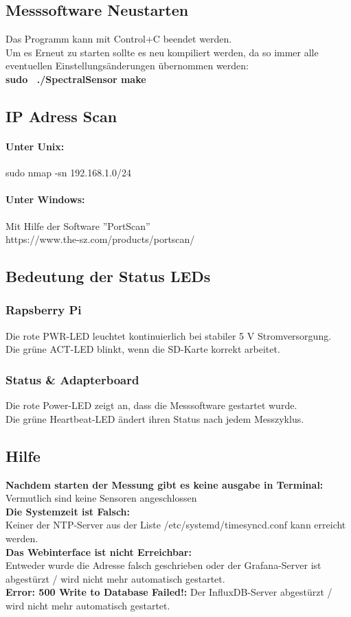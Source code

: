 \subsection{Messsoftware Neustarten}
\label{restart}
Das Programm kann mit Control+C beendet werden.\\
Um es Erneut zu starten sollte es neu kompiliert werden, da so immer alle eventuellen Einstellungsänderungen übernommen werden:\\
\textbf{sudo ~./SpectralSensor make}\\




\subsection{IP Adress Scan}
\paragraph{Unter Unix:} sudo nmap -sn 192.168.1.0/24  
\paragraph{Unter Windows:} Mit Hilfe der Software ''PortScan'' \\https://www.the-sz.com/products/portscan/\smallskip

\subsection{Bedeutung der Status LEDs}\label{leds}
\subsubsection{Rapsberry Pi}
Die rote PWR-LED leuchtet kontinuierlich bei stabiler 5 V Stromversorgung.\\
Die grüne ACT-LED blinkt, wenn die SD-Karte korrekt arbeitet.
\subsubsection{Status \& Adapterboard}
Die rote Power-LED zeigt an, dass die Messsoftware gestartet wurde.\\
Die grüne Heartbeat-LED ändert ihren Status nach jedem Messzyklus.\\


\subsection{Hilfe}
\textbf{Nachdem starten der Messung gibt es keine ausgabe in Terminal:}\\
Vermutlich sind keine Sensoren angeschlossen\\
\textbf{Die Systemzeit ist Falsch:}\\
Keiner der NTP-Server aus der Liste /etc/systemd/timesyncd.conf kann erreicht werden.\\
\textbf{Das Webinterface ist nicht Erreichbar:}\\
Entweder wurde die Adresse falsch geschrieben oder der Grafana-Server ist abgestürzt / wird nicht mehr automatisch gestartet.\\
\textbf{Error: 500
Write to Database Failed!:}
Der InfluxDB-Server abgestürzt / wird nicht mehr automatisch gestartet.

